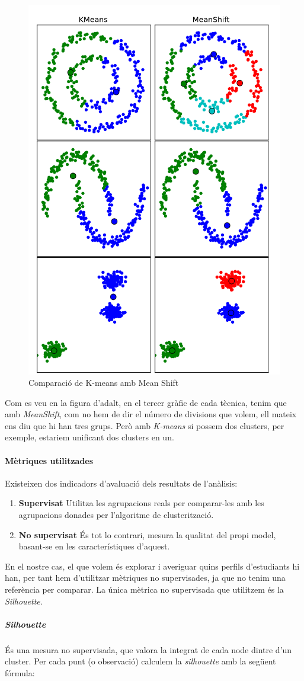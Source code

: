 \documentclass[12pt,a4paper,catalan]{article}
\begin{document}
\begin{figure}[h]
\centering
\includegraphics[width=.4\linewidth]{img/kmeansVsMeanshift.png}
\caption{Comparació de K-means amb Mean Shift}
\end{figure}

Com es veu en la figura d'adalt, en el tercer gràfic de cada tècnica, tenim que amb \textit{MeanShift}, com no hem de dir el número de divisions que volem, ell mateix ens diu que hi han tres grups. Però amb \textit{K-means} si possem dos clusters, per exemple, estariem unificant dos clusters en un.

\newpage

\paragraph{Mètriques utilitzades}
Existeixen dos indicadors d'avaluació dels resultats de l'anàlisis:
\begin{enumerate}
	\item \textbf{Supervisat} Utilitza les agrupacions reals per comparar-les amb les agrupacions donades per l'algoritme de clusterització.
	\item \textbf{No supervisat} És tot lo contrari, mesura la qualitat del propi model, basant-se en les característiques d'aquest.
\end{enumerate}

En el nostre cas, el que volem és explorar i averiguar quins perfils d'estudiants hi han, per tant hem d'utilitzar mètriques no supervisades, ja que no tenim una referència per comparar. La única mètrica no supervisada que utilitzem és la \textit{Silhouette}.

\subparagraph{\textit{Silhouette}}
És una mesura no supervisada, que valora la integrat de cada node dintre d'un cluster. Per cada punt (o observació) calculem la \textit{silhouette} amb la següent fórmula:
\end{document}
